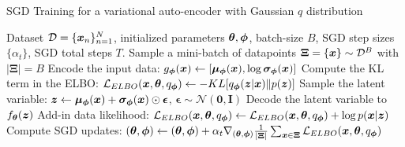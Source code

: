 \begin{algorithm}[t]
\caption{SGD Training for a variational auto-encoder with Gaussian $q$ distribution}\label{alg:vae}
\begin{algorithmic}[1]
\Require Dataset $\mathcal{D} = \{ \bm{x}_n \}_{n=1}^N$, initialized parameters $\bm{\theta}, \bm{\phi}$,  batch-size $B$, SGD step sizes $\{\alpha_t \}$, SGD total steps $T$.
\State Sample a mini-batch of datapoints $\bm{\Xi} = \{ \bm{x} \} \sim \mathcal{D}^B$ with $| \bm{\Xi} | = B$
\For{$\x \in \bm{\Xi}$}
    \State Encode the input data: $g_{\bm{\phi}}(\bm{x}) \gets [\bm{\mu}_{\bm{\phi}}(\bm{x}), \log \bm{\sigma}_{\bm{\phi}}(\bm{x})]$
    \State Compute the KL term in the ELBO:
    $\mathcal{L}_{ELBO}(\bm{x}, \bm{\theta}, q_{\bm{\phi}}) \gets - KL[q_{\bm{\phi}}(\bm{z} | \bm{x})\|p(\bm{z})]$
    \State Sample the latent variable: $\bm{z} \gets \bm{\mu}_{\bm{\phi}}(\bm{x}) + \bm{\sigma}_{\bm{\phi}}(\bm{x}) \odot \bm{\epsilon}$, $\bm{\epsilon} \sim \mathcal{N}(\bm{0}, \mathbf{I})$
    \State Decode the latent variable to $f_{\bm{\theta}}(\bm{z})$
    \State Add-in data likelihood: $\mathcal{L}_{ELBO}(\bm{x}, \bm{\theta}, q_{\bm{\phi}}) \gets \mathcal{L}_{ELBO}(\bm{x}, \bm{\theta}, q_{\bm{\phi}}) + \log p(\bm{x}| \bm{z})$
\EndFor
\State Compute SGD updates:
$(\bm{\theta}, \bm{\phi}) \gets (\bm{\theta}, \bm{\phi}) + \alpha_t \nabla_{(\bm{\theta}, \bm{\phi})} \frac{1}{|\bm{\Xi}|} \sum_{\bm{x} \in \bm{\Xi}} \mathcal{L}_{ELBO}(\bm{x}, \bm{\theta}, q_{\bm{\phi}})$
\EndFor
\end{algorithmic}
\end{algorithm}

